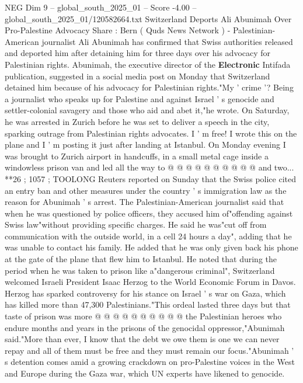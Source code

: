 \begin{textsample}{NEG Dim 9 – global\_south\_2025\_01 – Score -4.00 – global\_south\_2025\_01/120582664.txt}  \label{ex:f9_neg_115}
Switzerland Deports Ali Abunimah Over Pro-Palestine Advocacy Share : Bern ( Quds News Network ) - Palestinian-American journalist Ali Abunimah has confirmed that Swiss authorities released and deported him after detaining him for three days over his advocacy for Palestinian rights.
Abunimah, the executive director of the \textbf{Electronic} Intifada publication, suggested in a social media post on Monday that Switzerland detained him because of his advocacy for Palestinian rights."My ' crime '?
Being a journalist who speaks up for Palestine and against Israel ' s genocide and settler-colonial savagery and those who aid and abet it,"he wrote.
On Saturday, he was arrested in Zurich before he was set to deliver a speech in the city, sparking outrage from Palestinian rights advocates.
I ' m free!
I wrote this on the plane and I ' m posting it just after landing at Istanbul.
On Monday evening I was brought to Zurich airport in handcuffs, in a small metal cage inside a windowless prison van and led all the way to @ @ @ @ @ @ @ @ @ @ and two... **26 ; 1057 ; TOOLONG Reuters reported on Sunday that the Swiss police cited an entry ban and other measures under the country ' s immigration law as the reason for Abunimah ' s arrest.
The Palestinian-American journalist said that when he was questioned by police officers, they accused him of"offending against Swiss law"without providing specific charges.
He said he was"cut off from communication with the outside world, in a cell 24 hours a day", adding that he was unable to contact his family.
He added that he was only given back his phone at the gate of the plane that flew him to Istanbul.
He noted that during the period when he was taken to prison like a"dangerous criminal", Switzerland welcomed Israeli President Isaac Herzog to the World Economic Forum in Davos.
Herzog has sparked controversy for his stance on Israel ' s war on Gaza, which has killed more than 47,300 Palestinians."This ordeal lasted three days but that taste of prison was more @ @ @ @ @ @ @ @ @ @ the Palestinian heroes who endure months and years in the prisons of the genocidal oppressor,"Abunimah said."More than ever, I know that the debt we owe them is one we can never repay and all of them must be free and they must remain our focus."Abunimah ' s detention comes amid a growing crackdown on pro-Palestine voices in the West and Europe during the Gaza war, which UN experts have likened to genocide.

\end{textsample}

